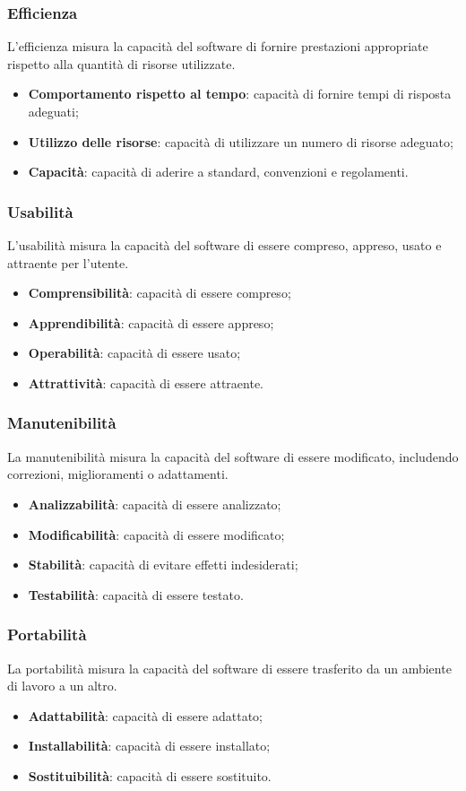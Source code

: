 \subsubsection{Efficienza}
L'efficienza misura la capacità del software di fornire prestazioni appropriate rispetto alla quantità di risorse utilizzate.
\begin{itemize}
    \item \textbf{Comportamento rispetto al tempo}: capacità di fornire tempi di risposta adeguati;
    \item \textbf{Utilizzo delle risorse}: capacità di utilizzare un numero di risorse adeguato;
    \item \textbf{Capacità}: capacità di aderire a standard, convenzioni e regolamenti.
\end{itemize}

\subsubsection{Usabilità}
L'usabilità misura la capacità del software di essere compreso, appreso, usato e attraente per l'utente.
\begin{itemize}
    \item \textbf{Comprensibilità}: capacità di essere compreso;
    \item \textbf{Apprendibilità}: capacità di essere appreso;
    \item \textbf{Operabilità}: capacità di essere usato;
    \item \textbf{Attrattività}: capacità di essere attraente.
\end{itemize}

\subsubsection{Manutenibilità}
La manutenibilità misura la capacità del software di essere modificato, includendo correzioni, miglioramenti o adattamenti.
\begin{itemize}
    \item \textbf{Analizzabilità}: capacità di essere analizzato;
    \item \textbf{Modificabilità}: capacità di essere modificato;
    \item \textbf{Stabilità}: capacità di evitare effetti indesiderati;
    \item \textbf{Testabilità}: capacità di essere testato.
\end{itemize}

\subsubsection{Portabilità}
La portabilità misura la capacità del software di essere trasferito da un ambiente di lavoro a un altro.
\begin{itemize}
    \item \textbf{Adattabilità}: capacità di essere adattato;
    \item \textbf{Installabilità}: capacità di essere installato;
    \item \textbf{Sostituibilità}: capacità di essere sostituito.
\end{itemize}